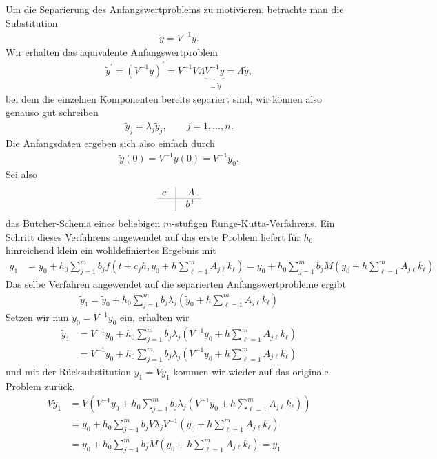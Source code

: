 \begin{solution}
Um die Separierung des Anfangswertproblems zu motivieren, betrachte man die Substitution
\begin{align*}
  \widetilde{y} = V^{-1}y.
\end{align*}
 Wir erhalten das äquivalente Anfangswertproblem
\begin{align*}
  \widetilde{y}^{\prime} = (V^{-1}y)^{\prime} = V^{-1}V\Lambda\underbrace{V^{-1}y}_{ = \widetilde{y}} = \Lambda\widetilde{y},
\end{align*}
bei dem die einzelnen Komponenten bereits separiert sind, wir können also genauso gut schreiben
\begin{align*}
  \widetilde{y}_j = \lambda_j\widetilde{y}_j, \qquad j = 1,\dots,n.
\end{align*}
Die Anfangsdaten ergeben sich also einfach durch
\begin{align*}
   \widetilde{y}(0) = V^{-1}y(0) = V^{-1}y_0.
\end{align*}
Sei also
\renewcommand{\arraystretch}{1.5}
\begin{align*}
  \begin{matrix}
    c & \vline & A \\
    \hline
    & \vline & b^{\top}
  \end{matrix}
\end{align*}
das Butcher-Schema eines beliebigen $m$-stufigen Runge-Kutta-Verfahrens.
Ein Schritt dieses Verfahrens angewendet auf das erste Problem liefert für $h_0$
hinreichend klein ein wohldefiniertes Ergebnis mit
\begin{align*}
  y_1 &= y_0 + h_0 \sum_{j=1}^m b_jf\left(t + c_jh, y_0 + h\sum_{\ell = 1}^m A_{j\ell}k_{\ell}\right)
  = y_0 + h_0 \sum_{j=1}^m b_jM\left(y_0 + h\sum_{\ell = 1}^m A_{j\ell}k_{\ell}\right)
\end{align*}
Das selbe Verfahren angewendet auf die separierten Anfangswertprobleme ergibt
\begin{align*}
  \widetilde{y}_{1} = \widetilde{y}_{0} + h_0 \sum_{j=1}^m b_j\lambda_j\left(\widetilde{y}_{0} + h\sum_{\ell = 1}^m A_{j\ell}k_{\ell}\right)
\end{align*}
Setzen wir nun $\widetilde{y}_{0} = V^{-1}y_0$ ein, erhalten wir
\begin{align*}
  \widetilde{y}_{1} &= V^{-1}y_0 + h_0 \sum_{j=1}^m b_j\lambda_j\left(V^{-1}y_0 + h\sum_{\ell = 1}^m A_{j\ell}k_{\ell}\right) \\
  &= V^{-1}y_0 + h_0 \sum_{j=1}^m b_j\lambda_j\left(V^{-1}y_0 + h\sum_{\ell = 1}^m A_{j\ell}k_{\ell}\right)
\end{align*}
und mit der Rücksubstitution $y_1 = V\widetilde{y}_{1}$ kommen wir wieder auf
das originale Problem zurück.
\begin{align*}
  V\widetilde{y}_{1} &= V\left(V^{-1}y_0 + h_0 \sum_{j=1}^m b_j\lambda_j\left(V^{-1}y_0 + h\sum_{\ell = 1}^m A_{j\ell}k_{\ell}\right)\right) \\
  &= y_0 + h_0 \sum_{j=1}^m b_jV\lambda_jV^{-1}\left(y_0 + h\sum_{\ell = 1}^m A_{j\ell}k_{\ell}\right) \\
  &= y_0 + h_0 \sum_{j=1}^m b_jM\left(y_0 + h\sum_{\ell = 1}^m A_{j\ell}k_{\ell}\right) = y_1
\end{align*}
\end{solution}
